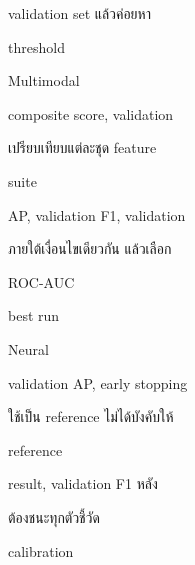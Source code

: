 \documentclass[12pt,a4paper]{report}
\begin{document}
validation set แล้วค่อยหา\par
threshold\par
Multimodal\par
composite score, validation\par
เปรียบเทียบแต่ละชุด feature\par
suite\par
AP, validation F1, validation\par
ภายใต้เงื่อนไขเดียวกัน แล้วเลือก\par
ROC-AUC\par
best run\par
Neural\par
validation AP, early stopping\par
ใช้เป็น reference ไม่ได้บังคับให้\par
reference\par
result, validation F1 หลัง\par
ต้องชนะทุกตัวชี้วัด\par
calibration\par
\clearpage
\end{document}
